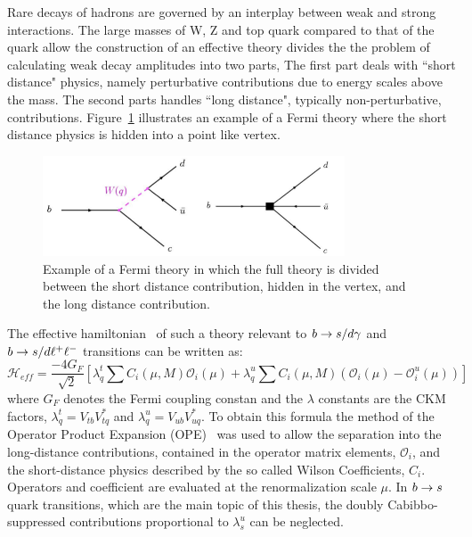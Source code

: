 Rare decays of \bquark hadrons are governed by an interplay between weak
and strong interactions.
The large masses of W, Z and top quark compared to that of the \bquark quark allow
the construction of an effective theory divides the the problem of calculating
weak decay amplitudes into two parts, The first part deals with ``short distance" physics, namely
perturbative contributions due to energy scales above the \bquark mass. The second parts handles
 ``long distance", typically non-perturbative, contributions. Figure~\ref{fig:fermi_theory} illustrates 
an example of a Fermi theory where the short distance physics is hidden into a point like vertex.
\begin{figure}[h!]
\centering
\includegraphics[width=0.8\textwidth]{Introduction/figs/fermi_theory.png}
\caption{Example of a Fermi theory in which the full theory is divided between the
short distance contribution, hidden in the vertex, and the long distance contribution.}
\label{fig:fermi_theory}
\end{figure}
The effective hamiltonian~\cite{Chetyrkin:1996vx} of such a theory relevant to
$b\rightarrow s/d \gamma$ and  $b\rightarrow s/d \ell^+\ell^-$
transitions can be written as:
%
\begin{equation}
\mathcal{H}_{eff} = \frac{-4G_F}{\sqrt{2}} \left[ \lambda^t_q \sum C_i(\mu,M)\mathcal{O}_i(\mu)
+ \lambda^u_q \sum C_i(\mu,M)(\mathcal{O}_i(\mu) - \mathcal{O}_i^u(\mu)) \right]
\end{equation}
%
where $G_F$ denotes the Fermi coupling constan and the $\lambda$ constants are the CKM factors,  $\lambda^t_q = V_{tb}V_{tq}^*$ and  $\lambda^u_q = V_{ub}V_{uq}^*$. To obtain this formula the method of the Operator Product Expansion (OPE)~\cite{Buchalla:1995vs} was used to allow the separation into
the long-distance contributions, contained in the operator matrix elements, $\mathcal{O}_i$, and the short-distance physics described by the so called Wilson Coefficients, $C_i$.
Operators and coefficient are evaluated at the renormalization scale $\mu$.
In $b\rightarrow s$ quark transitions, which are the main topic of this thesis, 
the doubly Cabibbo-suppressed contributions proportional to $\lambda^u_s$ can be neglected.


